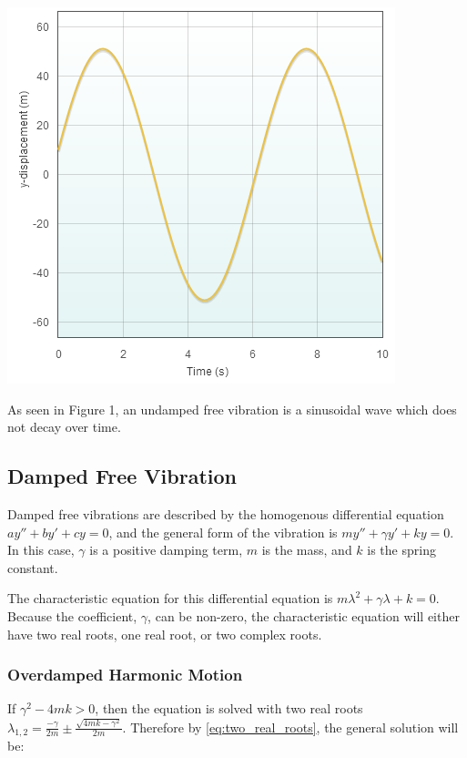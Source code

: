\documentclass[11pt]{article} %
\newenvironment{Figure}
  {\par\medskip\noindent\minipage{\linewidth}}
  {\endminipage\par\medskip}
\begin{document}
\begin{multicols}{2}
\begin{Figure}
 \centering
 \includegraphics[width=\linewidth]{undamped_free.png}
\end{Figure}

As seen in Figure 1, an undamped free vibration is a sinusoidal wave which does not decay over time. 

\subsection {Damped Free Vibration}
Damped free vibrations are described by the homogenous differential equation $ay'' + by' +cy = 0$, and the general form of the vibration is $my'' + {\gamma}y' + ky = 0$. In this case, $\gamma$ is a positive damping term, $m$ is the mass, and $k$ is the spring constant.

The characteristic equation for this differential equation is $m{\lambda}^2 + {\gamma}{\lambda} + k = 0$. Because the coefficient, $\gamma$, can be non-zero, the characteristic equation will either have two real roots, one real root, or two complex roots.
\subsubsection {Overdamped Harmonic Motion}
If ${\gamma}^2 - 4mk > 0$, then the equation is solved with two real roots ${\lambda}_{1,2} = {\frac{-\gamma}{2m}} \pm \frac{\sqrt{4mk - {\gamma}^2}}{2m}$. Therefore by \eqref{eq:two_real_roots}, the general solution will be:


\end{multicols}
\end{document}
